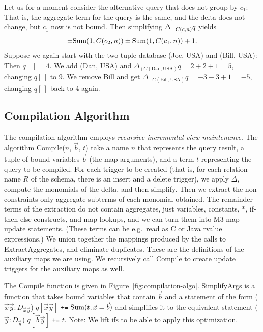 \begin{example}
Let us for a moment consider the alternative query that does not group by
$c_1$: That is, the aggregate term for the query is the same, and the delta does not change, but $c_1$ now is not bound. Then simplifying $\Delta_{\pm C(c,n)} q$ yields
\[
\pm \mbox{Sum}(1, C(c_2, n)) \pm \mbox{Sum}(1, C(c_1,n)) + 1.
\]
Suppose we again start with the two tuple database (Joe, USA) and (Bill, USA):
Then $q[\,] = 4$. We add (Dan, USA) and
$\Delta_{+C(\mathrm{Dan}, \mathrm{USA})} q = 2 + 2 + 1 = 5$, changing
$q[\,]$ to 9. We remove Bill and get
$\Delta_{-C(\mathrm{Bill}, \mathrm{USA})} q = -3 - 3 + 1 = -5$, changing
$q[\,]$ back to 4 again.
\punto
\end{example}




\subsection{Compilation Algorithm}
\label{sec:compilation-alg}




The compilation algorithm employs {\em recursive incremental view
maintenance}. The algorithm Compile($n$, $\vec{b}$, $t$) take a name $n$ that
represents the query result, a tuple of bound variables $\vec{b}$ (the map
arguments), and a term $t$ representing the query to be compiled.
For each trigger to be created (that is, for each relation name $R$ of
the schema, there is an insert and a delete trigger),
we apply $\Delta$, compute the monomials of the delta, and then simplify.
Then we extract the non-constraints-only aggregate
subterms of each monomial obtained.
The remainder terms of the extraction
do not contain aggregates, just variables, constants, *,
if-then-else constructs, and map lookups, and we can turn them into
M3 map update statements. (These terms can be e.g.\ read as C or Java rvalue
expressions.)
%
We union together the mappings produced by the calls to ExtractAggregates,
and eliminate duplicates. 
These are the definitions of the auxiliary maps we are using.
We recursively call Compile to create update triggers for the
auxiliary maps as well.


The Compile function is given in Figure~\ref{fig:compilation-algo}. 
SimplifyArgs is a function that takes bound variables that contain
$\vec{b}$ and a statement of the form
($\vec{x}\vec{y}: D_{\vec{x}\vec{y}}$) $q[\vec{x}\vec{y}]$ {\tt +=}
$\mbox{Sum}(t, \vec{x}=\vec{b})$
and simplifies it to the equivalent statement
($\vec{y}: D_{\vec{y}}$) $q[\vec{b}\vec{y}]$ {\tt +=} $t$.
Note: We lift ifs to be able to apply this optimization.



